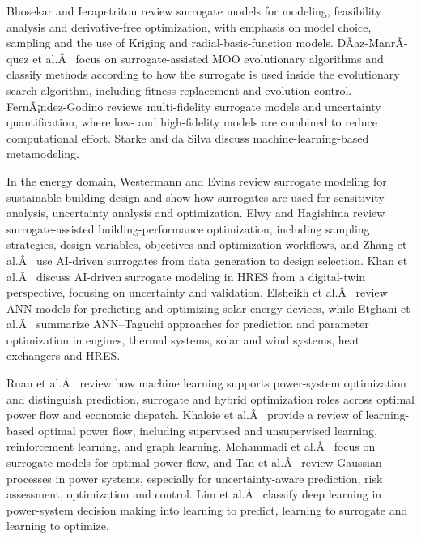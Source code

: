 \documentclass[final,5p,times,twocolumn]{elsarticle}
\begin{document}
Bhosekar and Ierapetritou \cite{Bhosekar2018} review surrogate models for modeling, feasibility
analysis and derivative-free optimization, with emphasis on model
choice, sampling and the use of Kriging and radial-basis-function
models. DÃ­az-ManrÃ­quez et al.Â~\cite{DiazManriquez2016} focus on surrogate-assisted MOO
evolutionary algorithms and classify methods according to how the
surrogate is used inside the evolutionary search algorithm, including
fitness replacement and evolution control. FernÃ¡ndez-Godino \cite{FernandezGodino2023} reviews
multi-fidelity surrogate models and uncertainty quantification, where
low- and high-fidelity models are combined to reduce computational
effort. Starke and da Silva \cite{Starke2025214} discuss
machine-learning-based metamodeling.

In the energy domain, Westermann and Evins \cite{Westermann2019} review surrogate modeling for
sustainable building design and show how surrogates are used for
sensitivity analysis, uncertainty analysis and optimization. Elwy and
Hagishima \cite{Elwy2024} review surrogate-assisted building-performance optimization, including
sampling strategies, design variables, objectives and optimization
workflows, and Zhang et al.Â~\cite{Zhang2026_building} use AI-driven surrogates from data
generation to design selection. Khan et al.Â~\cite{Khan2024_DT} discuss AI-driven
surrogate modeling in HRES from a digital-twin perspective, focusing on
uncertainty and validation. Elsheikh et al.Â~\cite{Elsheikh2019622} review ANN models for
predicting and optimizing solar-energy devices, while Etghani et
al.Â~\cite{Etghani2025}
summarize ANN--Taguchi approaches for prediction and parameter
optimization in engines, thermal systems, solar and wind systems, heat
exchangers and HRES.

Ruan et al.Â~\cite{Ruan2021221} review how machine learning supports power-system
optimization and distinguish prediction, surrogate and hybrid
optimization roles across optimal power flow and economic dispatch.
Khaloie et al.Â~\cite{Khaloie2025} provide a review of learning-based optimal power flow,
including supervised and unsupervised learning, reinforcement learning,
and graph learning. Mohammadi et al.Â~\cite{Mohammadi2024} focus on surrogate models for
optimal power flow, and Tan et al.Â~\cite{Tan2026} review Gaussian processes in power
systems, especially for uncertainty-aware prediction, risk assessment,
optimization and control. Lim et al.Â~\cite{Lim2025} classify deep learning in
power-system decision making into learning to predict, learning to
surrogate and learning to optimize.
\end{document}
